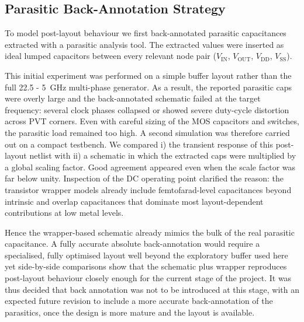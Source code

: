 \subsection{Parasitic Back-Annotation Strategy}

To model post-layout behaviour we first back-annotated parasitic capacitances extracted with a parasitic analysis tool.
The extracted values were inserted as ideal lumped capacitors between every relevant node pair (\(V_\text{IN}\), \(V_\text{OUT}\), \(V_\text{DD}\), \(V_\text{SS}\)).


This initial experiment was performed on a simple buffer layout rather than the full 22.5 - 5~GHz multi-phase generator.
As a result, the reported parasitic caps were overly large and the back-annotated schematic failed at the target frequency: several clock phases collapsed or showed severe duty-cycle distortion across PVT corners.
Even with careful sizing of the MOS capacitors and switches, the parasitic load remained too high.
A second simulation was therefore carried out on a compact testbench.  
We compared i) the transient response of this post-layout netlist with ii) a schematic in which the extracted caps were multiplied by a global scaling factor.  
Good agreement appeared even when the scale factor was far below unity.  
Inspection of the DC operating point clarified the reason: the transistor wrapper models already include femtofarad-level capacitances beyond intrinsic and overlap capacitances that dominate most layout-dependent contributions at low metal levels.

Hence the wrapper-based schematic already mimics the bulk of the real parasitic capacitance.  
A fully accurate absolute back-annotation would require a specialised, fully optimised layout well beyond the exploratory buffer used here yet side-by-side comparisons show that the schematic plus wrapper reproduces post-layout behaviour closely enough for the current stage of the project.
It was thus decided that back annotation was not to be introduced at this stage, with an expected future revision to include a more accurate back-annotation of the parasitics, once the design is more mature and the layout is available.

